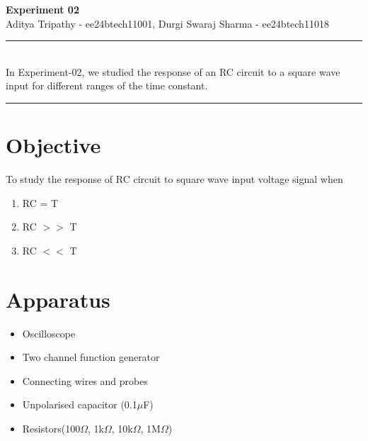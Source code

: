 \documentclass[a4paper,12pt]{article}
\renewenvironment{abstract}
 {\par\noindent\textbf{\abstractname}\ \ignorespaces \\}
 {\par\noindent\medskip}
\begin{document}
\pagestyle{fancy}
\thispagestyle{empty}
\fancyhead[L]{}
\renewcommand*{\thefootnote}{\fnsymbol{footnote}}
\begin{center}
\Large{\textbf{Experiment 02}}
\vspace{0.4cm}
\normalsize
\\ Aditya Tripathy - ee24btech11001, Durgi Swaraj Sharma - ee24btech11018\\
\medskip
\normalsize
\end{center}
{\color{gray}\hrule}
\vspace{0.4cm}
\begin{abstract}
In Experiment-02, we studied the response of an RC circuit to a square wave input for different ranges of the time constant.
\end{abstract}
{\color{gray}\hrule}
\medskip
\section{Objective}
To study the response of RC circuit to square wave input voltage signal when 
\begin{enumerate}
  \item RC = T
  \item RC $>>$ T
  \item RC $<<$ T
\end{enumerate}
\section{Apparatus}
\begin{itemize}
\item Oscilloscope
\item Two channel function generator
\item Connecting wires and probes
\item Unpolarised capacitor (0.1$\mu$F)
\item Resistors(100$\Omega$, 1k$\Omega$, 10k$\Omega$, 1M$\Omega$)
\end{itemize}
\end{document}
